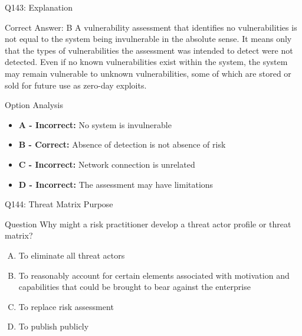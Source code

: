 \documentclass{beamer}
\begin{document}
	\begin{frame}{Q143: Explanation}
		\begin{block}{Correct Answer: B}
			A vulnerability assessment that identifies no vulnerabilities is not equal to the system being invulnerable in the absolute sense. It means only that the types of vulnerabilities the assessment was intended to detect were not detected. Even if no known vulnerabilities exist within the system, the system may remain vulnerable to unknown vulnerabilities, some of which are stored or sold for future use as zero-day exploits.
		\end{block}
		\begin{block}{Option Analysis}
			\begin{itemize}
				\item \textbf{A - Incorrect:} No system is invulnerable
				\item \textbf{B - Correct:} Absence of detection is not absence of risk
				\item \textbf{C - Incorrect:} Network connection is unrelated
				\item \textbf{D - Incorrect:} The assessment may have limitations
			\end{itemize}
		\end{block}
	\end{frame}
	
	\begin{frame}{Q144: Threat Matrix Purpose}
		\begin{block}{Question}
			Why might a risk practitioner develop a threat actor profile or threat matrix?
		\end{block}
		\begin{enumerate}[(A)]
			\item To eliminate all threat actors
			\item To reasonably account for certain elements associated with motivation and capabilities that could be brought to bear against the enterprise
			\item To replace risk assessment
			\item To publish publicly
		\end{enumerate}
	\end{frame}
	
\end{document}
